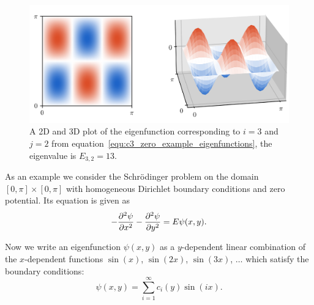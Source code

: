 \begin{figure}
  \begin{center}
    \includegraphics[width=\textwidth]{img/chapter3/example_zero_both.png}
  \end{center}
  \caption{A 2D and 3D plot of the eigenfunction corresponding to $i = 3$ and $j = 2$ from equation~\eqref{equ:c3_zero_example_eigenfunctions}, the eigenvalue is $E_{3,2} = 13$.}\label{fig:example_zero}
\end{figure}

As an example we consider the Schrödinger problem on the domain $[0, \pi] \times [0, \pi]$ with homogeneous Dirichlet boundary conditions and zero potential. Its equation is given as
\begin{equation}\label{equ:c3_example_zero_potential}
  -\pdv[2]{\psi}{x} - \pdv[2]{\psi}{y} = E \psi(x, y)\text{.}
\end{equation}

Now we write an eigenfunction $\psi(x, y)$ as a $y$-dependent linear combination of the $x$-dependent functions $\sin(x)$, $\sin(2x)$, $\sin(3x)$, $\dots$ which satisfy the boundary conditions:
\begin{equation}\label{equ:c3_zero_example_sin_basis}
  \psi(x, y) = \sum_{i=1}^\infty c_i(y) \sin(ix)\text{.}
\end{equation}

